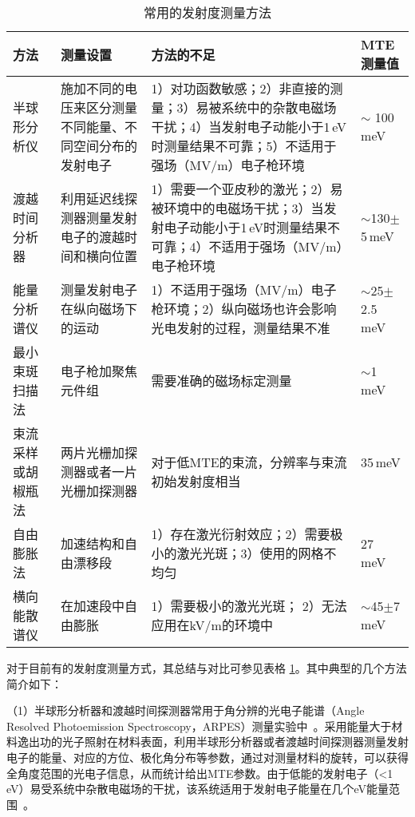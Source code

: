 \begin{table}[htbp]
\caption{常用的发射度测量方法}
\label{tab:method}
\centering
\begin{tabular}{p{2cm}p{3.5cm}p{5cm}p{2.5cm}}
\toprule
方法 & 测量设置 & 方法的不足 & MTE测量值 \\
\midrule
半球形分析仪~\cite{Palczewski:2010aa} & 施加不同的电压来区分测量不同能量、不同空间分布的发射电子 &1）对功函数敏感；2）非直接的测量；3）易被系统中的杂散电磁场干扰；4）当发射电子动能小于1\,eV时测量结果不可靠；5）不适用于强场（MV/m）电子枪环境 & $\sim$ 100\,meV~\cite{Droubay:2014aa} \\
渡越时间分析器~\cite{Wang:2012aa,Sertore:2004aa}  & 利用延迟线探测器测量发射电子的渡越时间和横向位置 &1）需要一个亚皮秒的激光；2）易被环境中的电磁场干扰；3）当发射电子动能小于1\,eV时测量结果不可靠；4）不适用于强场（MV/m）电子枪环境 & $\sim$130$\pm$5\,meV~\cite{sertore2004cesium} \\
能量分析谱仪~\cite{Karkare:2015aa,Orlov:2001aa} & 测量发射电子在纵向磁场下的运动 & 1）不适用于强场（MV/m）电子枪环境；2）纵向磁场也许会影响光电发射的过程，测量结果不准 & $\sim$25$\pm$2.5\,meV~\cite{Orlov:2001aa} \\
最小束斑扫描法~\cite{engelen2014effective,bazarov2008thermal,bazarov2011thermal,anderson2002space,hauri2010intrinsic} & 电子枪加聚焦元件组 & 需要准确的磁场标定测量 &  $\sim$1\,meV~\cite{engelen2014effective}\\
束流采样或胡椒瓶法~\cite{anderson2002space,Reiser:2008aa,gulliford2013demonstration} & 两片光栅加探测器或者一片光栅加探测器 & 对于低MTE的束流，分辨率与束流初始发射度相当 & 35\,meV ~\cite{Maxson:2015aa}\\
自由膨胀法~\cite{feng2015novel} & 加速结构和自由漂移段 & 1）存在激光衍射效应；2）需要极小的激光光斑；3）使用的网格不均匀 & 27\,meV~\cite{feng2015novel} \\
横向能散谱仪~\cite{jones2013commissioning}  & 在加速段中自由膨胀 & 1）需要极小的激光光斑； 2）无法应用在kV/m的环境中 & $\sim$45$\pm$7\,meV~\cite{jones2013commissioning} \\
\bottomrule
\end{tabular}
\end{table}

对于目前有的发射度测量方式，其总结与对比可参见表格 \ref{tab:method}\cite{lee2015review}。其中典型的几个方法简介如下：

（1）半球形分析器\cite{Palczewski:2010aa}和渡越时间探测器\cite{Wang:2012aa, Sertore:2004aa}常用于角分辨的光电子能谱（Angle Resolved Photoemission Spectroscopy，ARPES）测量实验中~\cite{Palczewski:2010aa,Zhang:2011aa}。采用能量大于材料逸出功的光子照射在材料表面，利用半球形分析器或者渡越时间探测器测量发射电子的能量、对应的方位、极化角分布等参数，通过对测量材料的旋转，可以获得全角度范围的光电子信息，从而统计给出MTE参数。由于低能的发射电子（<1\,eV）易受系统中杂散电磁场的干扰，该系统适用于发射电子能量在几个eV能量范围~\cite{Droubay:2014aa,Sertore:2004aa}。

